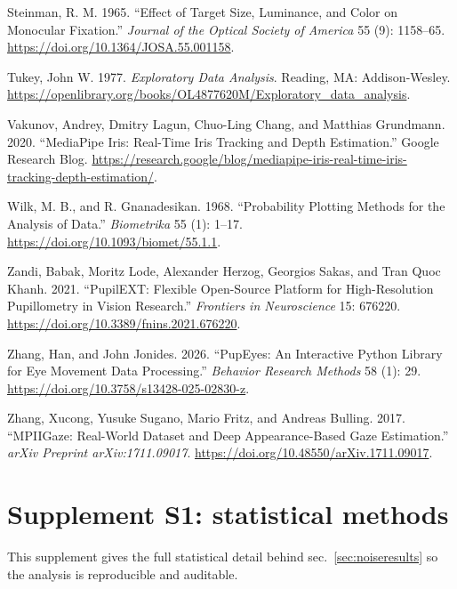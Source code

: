 \documentclass[
]{article}
\newlength{\cslhangindent}
\newenvironment{CSLReferences}[2] %
 {\begin{list}{}{%
  \setlength{\itemindent}{0pt}
  \setlength{\leftmargin}{0pt}
  \setlength{\parsep}{0pt}
  \ifodd #1
   \setlength{\leftmargin}{\cslhangindent}
   \setlength{\itemindent}{-1\cslhangindent}
  \fi
  \setlength{\itemsep}{#2\baselineskip}}}
 {\end{list}}
\begin{document}
\begin{CSLReferences}{1}{0}
Steinman, R. M. 1965. {``Effect of Target Size, Luminance, and Color on
Monocular Fixation.''} \emph{Journal of the Optical Society of America}
55 (9): 1158--65. \url{https://doi.org/10.1364/JOSA.55.001158}.

Tukey, John W. 1977. \emph{Exploratory Data Analysis}. Reading, MA:
Addison-Wesley.
\url{https://openlibrary.org/books/OL4877620M/Exploratory_data_analysis}.

Vakunov, Andrey, Dmitry Lagun, Chuo-Ling Chang, and Matthias Grundmann.
2020. {``MediaPipe Iris: Real-Time Iris Tracking and Depth
Estimation.''} Google Research Blog.
\url{https://research.google/blog/mediapipe-iris-real-time-iris-tracking-depth-estimation/}.

Wilk, M. B., and R. Gnanadesikan. 1968. {``Probability Plotting Methods
for the Analysis of Data.''} \emph{Biometrika} 55 (1): 1--17.
\url{https://doi.org/10.1093/biomet/55.1.1}.

Zandi, Babak, Moritz Lode, Alexander Herzog, Georgios Sakas, and Tran
Quoc Khanh. 2021. {``PupilEXT: Flexible Open-Source Platform for
High-Resolution Pupillometry in Vision Research.''} \emph{Frontiers in
Neuroscience} 15: 676220.
\url{https://doi.org/10.3389/fnins.2021.676220}.

Zhang, Han, and John Jonides. 2026. {``PupEyes: An Interactive Python
Library for Eye Movement Data Processing.''} \emph{Behavior Research
Methods} 58 (1): 29. \url{https://doi.org/10.3758/s13428-025-02830-z}.

Zhang, Xucong, Yusuke Sugano, Mario Fritz, and Andreas Bulling. 2017.
{``MPIIGaze: Real-World Dataset and Deep Appearance-Based Gaze
Estimation.''} \emph{arXiv Preprint arXiv:1711.09017}.
\url{https://doi.org/10.48550/arXiv.1711.09017}.

\end{CSLReferences}

\section{Supplement S1: statistical methods}\label{sec:statmethods}

This supplement gives the full statistical detail behind
sec.~\ref{sec:noiseresults} so the analysis is reproducible and
auditable.
\end{document}
